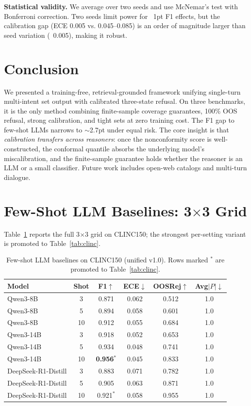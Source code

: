\documentclass[sigconf, anonymous, review]{acmart}
\begin{document}
\textbf{Statistical validity.} We average over two seeds and use McNemar's test with Bonferroni correction. Two seeds limit power for ~1pt F1 effects, but the calibration gap (ECE 0.005 vs. 0.045--0.085) is an order of magnitude larger than seed variation (~0.005), making it robust.

\section{Conclusion}
\label{sec:conclusion}
We presented a training-free, retrieval-grounded framework unifying single-turn multi-intent set output with calibrated three-state refusal. On three benchmarks, it is the only method combining finite-sample coverage guarantees, 100\% OOS refusal, strong calibration, and tight sets at zero training cost. The F1 gap to few-shot LLMs narrows to $\sim$2.7pt under equal risk. The core insight is that \emph{calibration transfers across reasoners}: once the nonconformity score is well-constructed, the conformal quantile absorbs the underlying model's miscalibration, and the finite-sample guarantee holds whether the reasoner is an LLM or a small classifier. Future work includes open-web catalogs and multi-turn dialogue.

\clearpage



\clearpage
\appendix
\section{Few-Shot LLM Baselines: 3$\times$3 Grid}
\label{app:fewshot}
Table~\ref{tab:app} reports the full 3$\times$3 grid on CLINC150; the strongest per-setting variant is promoted to Table~\ref{tab:clinc}.

\begin{table}[!h]
\centering\small\setlength{\tabcolsep}{4pt}
\caption{Few-shot LLM baselines on CLINC150 (unified v1.0). Rows marked $^\ast$ are promoted to Table~\ref{tab:clinc}.}
\label{tab:app}
\begin{tabular}{lccccc}
\toprule
Model & Shot & F1$\uparrow$ & ECE$\downarrow$ & OOSRej$\uparrow$ & Avg$|P|$$\downarrow$ \\
\midrule
Qwen3-8B & 3 & 0.871 & 0.062 & 0.512 & 1.0 \\
Qwen3-8B & 5 & 0.894 & 0.058 & 0.601 & 1.0 \\
Qwen3-8B & 10 & 0.912 & 0.055 & 0.684 & 1.0 \\
Qwen3-14B & 3 & 0.918 & 0.052 & 0.653 & 1.0 \\
Qwen3-14B & 5 & 0.934 & 0.048 & 0.741 & 1.0 \\
Qwen3-14B & 10 & \textbf{0.956}$^\ast$ & 0.045 & 0.833 & 1.0 \\
DeepSeek-R1-Distill & 3 & 0.883 & 0.071 & 0.782 & 1.0 \\
DeepSeek-R1-Distill & 5 & 0.905 & 0.063 & 0.871 & 1.0 \\
DeepSeek-R1-Distill & 10 & 0.921$^\ast$ & 0.058 & 0.955 & 1.0 \\
\bottomrule
\end{tabular}
\end{table}
\end{document}
